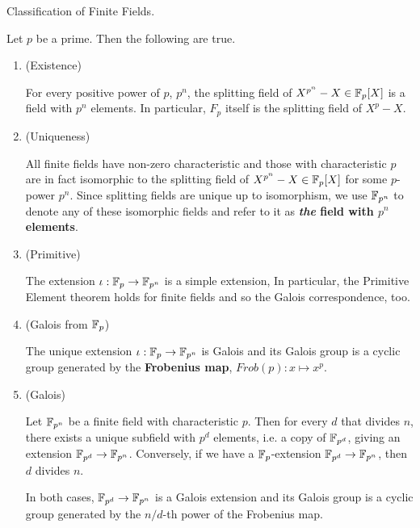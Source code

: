 \documentclass[../book.tex]{subfiles}
\begin{document}
\begin{thm} Classification of Finite Fields.
    
    Let $p$ be a prime. Then the following are true. 
    \begin{enumerate}
        \item (Existence)
        
        For every positive power of $p$, $p^n$, 
        the splitting field of $X^{p^n} - X \in \mathbb{F}_p[X]$
        is a field with $p^n$ elements.
        In particular, $F_p$ itself is the splitting field of $X^p - X$. 
        \item (Uniqueness)
        
        All finite fields have non-zero characteristic and 
        those with characteristic $p$ are in fact isomorphic to
        the splitting field of $X^{p^n} - X \in \mathbb{F}_p[X]$ for some $p$-power $p^n$. 
        Since splitting fields are unique up to isomorphism,
        we use $\mathbb{F}_{p^n}$ to denote any of these isomorphic fields
        and refer to it as \textbf{\emph{the} field with $p^n$ elements}. 
        \item (Primitive)
        
        The extension $\iota : \mathbb{F}_p \to \mathbb{F}_{p^n}$ is a simple extension,
        In particular, the Primitive Element theorem holds for finite fields
        and so the Galois correspondence, too. 
        \item (Galois from $\mathbb{F}_p$)
        
        The unique extension $\iota : \mathbb{F}_p \to \mathbb{F}_{p^n}$ is Galois and 
        its Galois group is a cyclic group generated by 
        the \textbf{Frobenius map}, $Frob(p) : x \mapsto x^p$. 
        \item (Galois)
        
        Let $\mathbb{F}_{p^n}$ be a finite field with characteristic $p$. 
        Then for every $d$ that divides $n$, 
        there exists a unique subfield with $p^d$ elements, 
        i.e. a copy of $\mathbb{F}_{p^d}$, giving an extension $\mathbb{F}_{p^d} \to \mathbb{F}_{p^n}$.
        Conversely, if we have a $\mathbb{F}_p$-extension $\mathbb{F}_{p^d} \to \mathbb{F}_{p^n}$,
        then $d$ divides $n$. 
        
        In both cases, 
        $\mathbb{F}_{p^d} \to \mathbb{F}_{p^n}$ is a Galois extension and 
        its Galois group is a cyclic group generated by 
        the $n/d$-th power of the Frobenius map. 
    \end{enumerate}
    
\end{thm}
\end{document}
